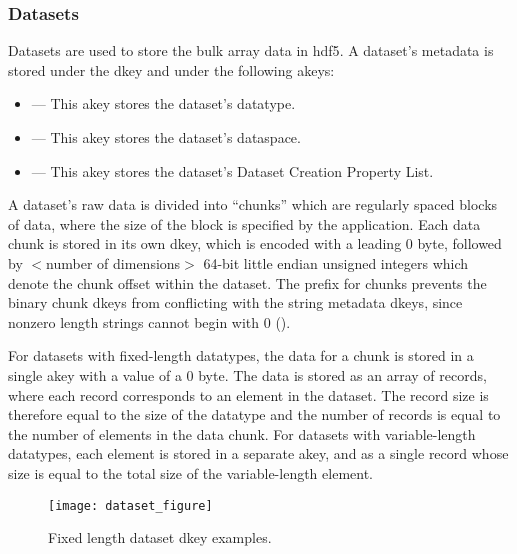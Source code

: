 \documentclass[../design_doc.tex]{subfiles}
\begin{document}
\newpage

\subsubsection{Datasets}

Datasets are used to store the bulk array data in \acrshort{hdf5}. A dataset's metadata is stored under the  \gls{dkey} and under the following \glspl{akey}:

\begin{itemize}
 \item {} --- This \gls{akey} stores the dataset's datatype.
 \item {} --- This \gls{akey} stores the dataset's dataspace.
 \item {} --- This \gls{akey} stores the dataset's Dataset Creation Property List.
\end{itemize}

A dataset's raw data is divided into ``chunks'' which are regularly spaced blocks of data, where the size of the block is specified by the application. Each data chunk is stored in its own \gls{dkey}, which is encoded with a leading 0 byte, followed by $<$number of dimensions$>$ 64-bit little endian unsigned integers which denote the chunk offset within the dataset. The  prefix for chunks prevents the binary chunk \glspl{dkey} from conflicting with the string metadata \glspl{dkey}, since nonzero length strings cannot begin with 0 (\mintcinline{\0}).

For datasets with fixed-length datatypes, the data for a chunk is stored in a single \gls{akey} with a value of a 0 byte. The data is stored as an array of records, where each record corresponds to an element in the dataset. The record size is therefore equal to the size of the datatype and the number of records is equal to the number of elements in the data chunk. For datasets with variable-length datatypes, each element is stored in a separate \gls{akey}, and as a single record whose size is equal to the total size of the variable-length element.

\begin{figure}
\texttt{[image: dataset\_figure]}
\caption{Fixed length dataset dkey examples.}
\label{fig:dataset}
\end{figure}

\newpage
\end{document}
